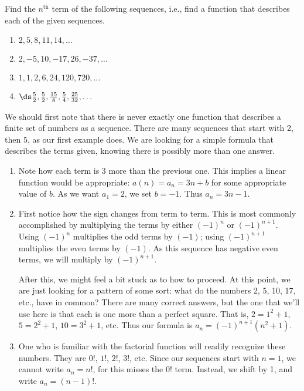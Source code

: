 \begin{example}\label{ex_seq2}
Find the $n^\text{th}$ term of the following sequences, i.e., find a function that describes each of the given sequences.
\begin{multicols}{2}
\begin{enumerate}
\item		$2, 5, 8, 11, 14, \dotsc$
\item		$2, -5, 10, -17, 26, -37, \dotsc$
\item		$1, 1, 2, 6, 24, 120, 720, \dotsc$
\item		$\ds \frac52, \frac52, \frac{15}8, \frac54, \frac{25}{32}, \dotsc$
\end{enumerate}
\end{multicols}
\solution
We should first note that there is never exactly one function that describes a finite set of numbers as a sequence. There are many sequences that start with 2, then 5, as our first example does. We are looking for a simple formula that describes the terms given, knowing there is possibly more than one answer.
\begin{enumerate}
\item		Note how each term is 3 more than the previous one. This implies a linear function would be appropriate: $a(n) = a_n = 3n + b$ for some appropriate value of $b$. As we want $a_1=2$, we set $b=-1$. Thus $a_n = 3n-1$.

\item		First notice how the sign changes from term to term. This is most commonly accomplished by multiplying the terms by either $(-1)^n$ or $(-1)^{n+1}$. Using $(-1)^n$ multiplies the odd terms by $(-1)$; using $(-1)^{n+1}$ multiplies the even terms by $(-1)$. As this sequence has negative even terms, we will multiply by $(-1)^{n+1}$. 

After this, we might feel a bit stuck as to how to proceed. At this point, we are just looking for a pattern of some sort: what do the numbers 2, 5, 10, 17, etc., have in common? There are many correct answers, but the one that we'll use here is that each is one more than a perfect square. That is, $2=1^2+1$, $5=2^2+1$, $10=3^2+1$, etc. Thus our formula is $a_n= (-1)^{n+1}(n^2+1)$.

\item		One who is familiar with the factorial function will readily recognize these numbers. They are $0!$, $1!$, $2!$, $3!$, etc. Since our sequences start with $n=1$, we cannot write $a_n = n!$, for this misses the $0!$ term. Instead, we shift by 1, and write $a_n = (n-1)!$.


\end{enumerate}
\end{example}
